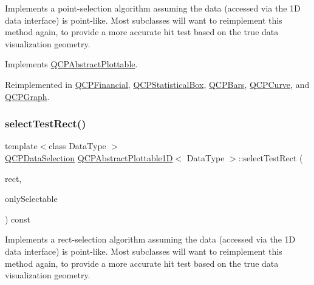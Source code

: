Implements a point-\/selection algorithm assuming the data (accessed via the 1D data interface) is point-\/like. Most subclasses will want to reimplement this method again, to provide a more accurate hit test based on the true data visualization geometry.

Implements \mbox{\hyperlink{class_q_c_p_abstract_plottable_a38efe9641d972992a3d44204bc80ec1d}{Q\+C\+P\+Abstract\+Plottable}}.



Reimplemented in \mbox{\hyperlink{class_q_c_p_financial_aac8e91622ac58330fa9ce81cc8fd40ee}{Q\+C\+P\+Financial}}, \mbox{\hyperlink{class_q_c_p_statistical_box_a1607fa92f829c631107c20ccb2d70a6d}{Q\+C\+P\+Statistical\+Box}}, \mbox{\hyperlink{class_q_c_p_bars_a121f899c27af3186fe93dcd0eb98f49b}{Q\+C\+P\+Bars}}, \mbox{\hyperlink{class_q_c_p_curve_a0ed9b7e6b4bc72010d6fcd974af46a8b}{Q\+C\+P\+Curve}}, and \mbox{\hyperlink{class_q_c_p_graph_a6d669d04462d272c6aa0e5f85846d673}{Q\+C\+P\+Graph}}.

\mbox{\label{class_q_c_p_abstract_plottable1_d_ac385c38a79e419ed3600c2ee398fd216}} 
\subsubsection{\texorpdfstring{select\+Test\+Rect()}{selectTestRect()}}
{\footnotesize\ttfamily template$<$class Data\+Type $>$ \\
\mbox{\hyperlink{class_q_c_p_data_selection}{Q\+C\+P\+Data\+Selection}} \mbox{\hyperlink{class_q_c_p_abstract_plottable1_d}{Q\+C\+P\+Abstract\+Plottable1D}}$<$ Data\+Type $>$\+::select\+Test\+Rect (\begin{DoxyParamCaption}\item[{const Q\+RectF \&}]{rect,  }\item[{bool}]{only\+Selectable }\end{DoxyParamCaption}) const\hspace{0.3cm}{\ttfamily [virtual]}}

Implements a rect-\/selection algorithm assuming the data (accessed via the 1D data interface) is point-\/like. Most subclasses will want to reimplement this method again, to provide a more accurate hit test based on the true data visualization geometry.

